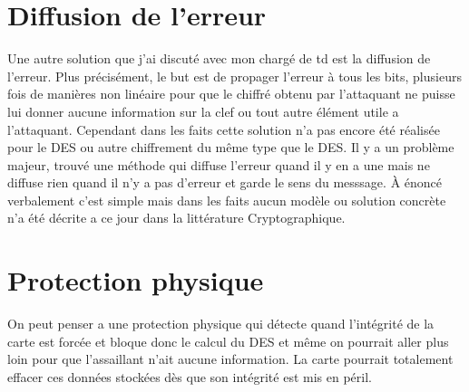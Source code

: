 \documentclass[a4paper,10pt]{report}
\begin{document}
			\section{Diffusion de l'erreur}
				Une autre solution que j'ai discuté avec mon chargé de td est la diffusion de l'erreur. Plus précisément, le but est de propager l'erreur à tous les bits, plusieurs fois de manières non linéaire pour que le chiffré obtenu par l'attaquant ne puisse lui donner aucune information sur la clef ou tout autre élément utile a l'attaquant.
				Cependant dans les faits cette solution n'a pas encore été réalisée pour le DES ou autre chiffrement du même type que le DES. Il y a un problème majeur, trouvé une méthode qui diffuse l'erreur quand il y en a une mais ne diffuse rien quand il n'y a pas d'erreur et garde le sens du messsage. À énoncé verbalement c'est simple mais dans les faits aucun modèle ou solution concrète n'a été décrite a ce jour dans la littérature Cryptographique.
			\newpage
			\section{Protection physique}
			On peut penser a une protection physique qui détecte quand l'intégrité de la carte est forcée et bloque donc le calcul du DES et même on pourrait aller plus loin pour que l'assaillant n'ait aucune information. La carte pourrait totalement effacer ces données stockées dès que son intégrité est mis en péril.
\end{document}
